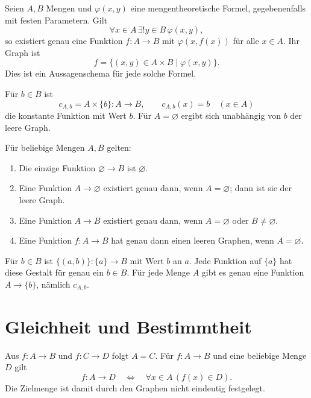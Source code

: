 \begin{theorem}
\label{b05guide:thm:description}
Seien $A,B$ Mengen und $\varphi(x,y)$ eine mengentheoretische
Formel, gegebenenfalls mit festen Parametern. Gilt
\[
 \forall x\in A\,\exists!y\in B\,\varphi(x,y),
\]
so existiert genau eine Funktion $f\colon A\to B$ mit
$\varphi(x,f(x))$ für alle $x\in A$. Ihr Graph ist
\[
 f=\{(x,y)\in A\times B\mid\varphi(x,y)\}.
\]
Dies ist ein Aussagenschema für jede solche Formel.
\end{theorem}

\begin{definition}
Für $b\in B$ ist
\[
 c_{A,b}=A\times\{b\}\colon A\to B,\qquad c_{A,b}(x)=b\quad(x\in A)
\]
die konstante Funktion mit Wert $b$.
Für $A=\varnothing$ ergibt sich unabhängig von $b$ der leere Graph.
\end{definition}

\begin{theorem}
\label{b05guide:thm:empty}
Für beliebige Mengen $A,B$ gelten:
\begin{enumerate}
 \item Die einzige Funktion $\varnothing\to B$ ist $\varnothing$.
 \item Eine Funktion $A\to\varnothing$ existiert genau dann,
       wenn $A=\varnothing$; dann ist sie der leere Graph.
 \item Eine Funktion $A\to B$ existiert genau dann,
       wenn $A=\varnothing$ oder $B\ne\varnothing$.
 \item Eine Funktion $f\colon A\to B$ hat genau dann einen
       leeren Graphen, wenn $A=\varnothing$.
\end{enumerate}
\end{theorem}

\begin{theorem}
Für $b\in B$ ist $\{(a,b)\}\colon\{a\}\to B$ mit Wert $b$ an $a$.
Jede Funktion auf $\{a\}$ hat diese Gestalt für genau ein $b\in B$.
Für jede Menge $A$ gibt es genau eine Funktion $A\to\{b\}$,
nämlich $c_{A,b}$.
\end{theorem}

\section{Gleichheit und Bestimmtheit}

\begin{theorem}
\label{b05guide:thm:domain}
Aus $f\colon A\to B$ und $f\colon C\to D$ folgt $A=C$.
Für $f\colon A\to B$ und eine beliebige Menge $D$ gilt
\[
 f\colon A\to D
 \quad\Longleftrightarrow\quad
 \forall x\in A\,(f(x)\in D).
\]
Die Zielmenge ist damit durch den Graphen nicht eindeutig festgelegt.
\end{theorem}

